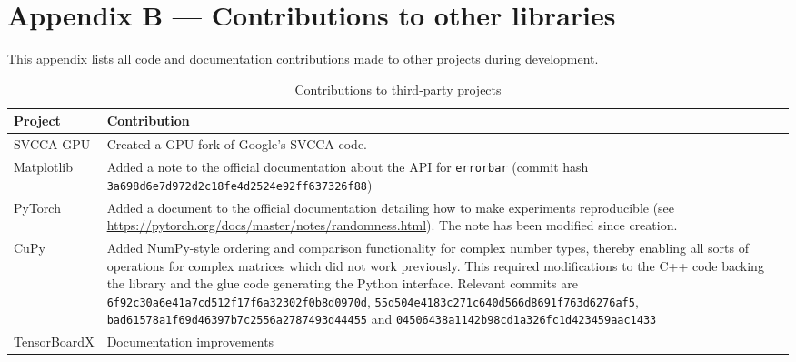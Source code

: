 \chapter{Appendix B --- Contributions to other libraries}\label{ch:appendixB}

This appendix lists all code and documentation contributions made to other projects during
development.

\begin{table}[h]
    \centering
    \caption{Contributions to third-party projects}
    \label{tbl:pull}
    \begin{tabularx}{\textwidth}{lX}
        \toprule
        Project              & Contribution                                                  \tabularnewline
        \midrule
        SVCCA-GPU            & Created a GPU-fork of Google's SVCCA code.                    \tabularnewline
        Matplotlib           & Added a note to the official documentation about the API
                               for \texttt{errorbar} (commit hash
                               \texttt{3a698d6e7d972d2c18fe4d2524e92ff637326f88})            \tabularnewline
        PyTorch              & Added a document to the official documentation detailing
                               how to make experiments reproducible (see
                               \url{https://pytorch.org/docs/master/notes/randomness.html}).
                               The note has been modified since creation.                    \tabularnewline
        CuPy                 & Added NumPy-style ordering and comparison
                               functionality
                               for complex number types, thereby enabling all sorts of operations for
                               complex matrices which did not work previously. This required
                               modifications to the C++ code backing the library and the glue code
                               generating the Python interface. Relevant commits are
                               \texttt{6f92c30a6e41a7cd512f17f6a32302f0b8d0970d},
                               \texttt{55d504e4183c271c640d566d8691f763d6276af5},
                               \texttt{bad61578a1f69d46397b7c2556a2787493d44455} and
                               \texttt{04506438a1142b98cd1a326fc1d423459aac1433}             \tabularnewline
        TensorBoardX         & Documentation improvements                                    \tabularnewline
        \bottomrule
    \end{tabularx}
\end{table}
